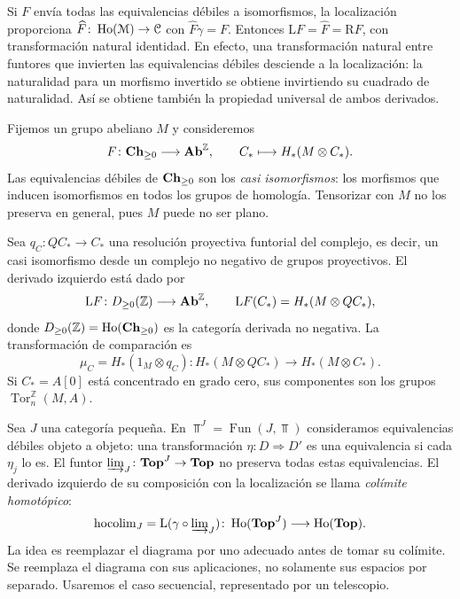 \begin{ejem}
Si $F$ envía todas las equivalencias débiles a isomorfismos, la localización proporciona $\widehat F\colon\operatorname{Ho}(\mathcal M)\to\mathcal C$ con $\widehat F\gamma=F$. Entonces $\mathrm LF=\widehat F=\mathrm RF$, con transformación natural identidad. En efecto, una transformación natural entre funtores que invierten las equivalencias débiles desciende a la localización: la naturalidad para un morfismo invertido se obtiene invirtiendo su cuadrado de naturalidad. Así se obtiene también la propiedad universal de ambos derivados.
\end{ejem}

\begin{ejem}
Fijemos un grupo abeliano $M$ y consideremos
\[
F\colon\mathbf{Ch}_{\ge0}\longrightarrow\mathbf{Ab}^{\mathbb Z},\qquad
C_*\longmapsto H_*(M\otimes C_*).
\]
Las equivalencias débiles de $\mathbf{Ch}_{\ge0}$ son los \emph{casi isomorfismos}: los morfismos que inducen isomorfismos en todos los grupos de homología. Tensorizar con $M$ no los preserva en general, pues $M$ puede no ser plano.

Sea $q_C\colon QC_*\to C_*$ una resolución proyectiva funtorial del complejo, es decir, un casi isomorfismo desde un complejo no negativo de grupos proyectivos. El derivado izquierdo está dado por
\[
\mathrm LF\colon D_{\ge0}(\mathbb Z)\longrightarrow\mathbf{Ab}^{\mathbb Z},\qquad
\mathrm LF(C_*)=H_*(M\otimes QC_*),
\]
donde $D_{\ge0}(\mathbb Z)=\operatorname{Ho}(\mathbf{Ch}_{\ge0})$ es la categoría derivada no negativa. La transformación de comparación es
\[
\mu_C=H_*(1_M\otimes q_C)\colon
H_*(M\otimes QC_*)\longrightarrow H_*(M\otimes C_*).
\]
Si $C_*=A[0]$ está concentrado en grado cero, sus componentes son los grupos $\operatorname{Tor}^{\mathbb Z}_n(M,A)$.
\end{ejem}

\begin{ejem}
Sea $J$ una categoría pequeña. En $\Top^J=\operatorname{Fun}(J,\Top)$ consideramos equivalencias débiles objeto a objeto: una transformación $\eta\colon D\Rightarrow D'$ es una equivalencia si cada $\eta_j$ lo es. El funtor $\varinjlim\nolimits_J\colon\mathbf{Top}^J\to\mathbf{Top}$ no preserva todas estas equivalencias. El derivado izquierdo de su composición con la localización se llama \emph{colímite homotópico}:
\[
\operatorname{hocolim}_J
=\mathrm L(\gamma\circ\varinjlim\nolimits_J)\colon
\operatorname{Ho}(\mathbf{Top}^J)\longrightarrow\operatorname{Ho}(\mathbf{Top}).
\]
La idea es reemplazar el diagrama por uno adecuado antes de tomar su colímite. Se reemplaza el diagrama con sus aplicaciones, no solamente sus espacios por separado. Usaremos el caso secuencial, representado por un telescopio.
\end{ejem}


